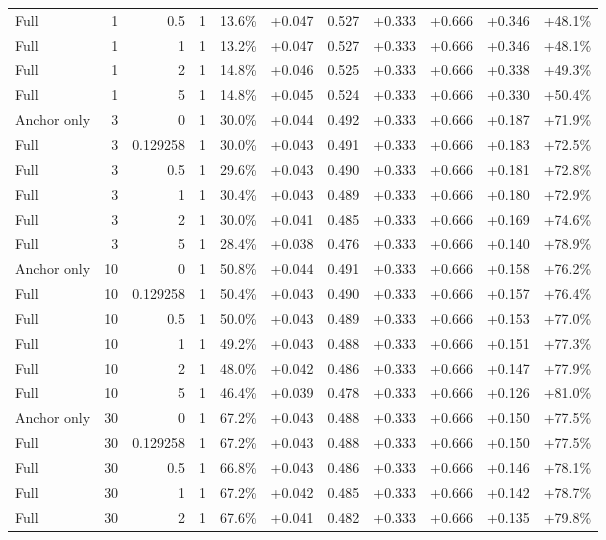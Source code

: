 \begin{table}[htbp]
\begin{tabular}{lrrrccccccc}
Full & 1 & 0.5 & 1 & 13.6\% & +0.047 & 0.527 & +0.333 & +0.666 & +0.346 & +48.1\% \\
Full & 1 & 1 & 1 & 13.2\% & +0.047 & 0.527 & +0.333 & +0.666 & +0.346 & +48.1\% \\
Full & 1 & 2 & 1 & 14.8\% & +0.046 & 0.525 & +0.333 & +0.666 & +0.338 & +49.3\% \\
Full & 1 & 5 & 1 & 14.8\% & +0.045 & 0.524 & +0.333 & +0.666 & +0.330 & +50.4\% \\
Anchor only & 3 & 0 & 1 & 30.0\% & +0.044 & 0.492 & +0.333 & +0.666 & +0.187 & +71.9\% \\
Full & 3 & 0.129258 & 1 & 30.0\% & +0.043 & 0.491 & +0.333 & +0.666 & +0.183 & +72.5\% \\
Full & 3 & 0.5 & 1 & 29.6\% & +0.043 & 0.490 & +0.333 & +0.666 & +0.181 & +72.8\% \\
Full & 3 & 1 & 1 & 30.4\% & +0.043 & 0.489 & +0.333 & +0.666 & +0.180 & +72.9\% \\
Full & 3 & 2 & 1 & 30.0\% & +0.041 & 0.485 & +0.333 & +0.666 & +0.169 & +74.6\% \\
Full & 3 & 5 & 1 & 28.4\% & +0.038 & 0.476 & +0.333 & +0.666 & +0.140 & +78.9\% \\
Anchor only & 10 & 0 & 1 & 50.8\% & +0.044 & 0.491 & +0.333 & +0.666 & +0.158 & +76.2\% \\
Full & 10 & 0.129258 & 1 & 50.4\% & +0.043 & 0.490 & +0.333 & +0.666 & +0.157 & +76.4\% \\
Full & 10 & 0.5 & 1 & 50.0\% & +0.043 & 0.489 & +0.333 & +0.666 & +0.153 & +77.0\% \\
Full & 10 & 1 & 1 & 49.2\% & +0.043 & 0.488 & +0.333 & +0.666 & +0.151 & +77.3\% \\
Full & 10 & 2 & 1 & 48.0\% & +0.042 & 0.486 & +0.333 & +0.666 & +0.147 & +77.9\% \\
Full & 10 & 5 & 1 & 46.4\% & +0.039 & 0.478 & +0.333 & +0.666 & +0.126 & +81.0\% \\
Anchor only & 30 & 0 & 1 & 67.2\% & +0.043 & 0.488 & +0.333 & +0.666 & +0.150 & +77.5\% \\
Full & 30 & 0.129258 & 1 & 67.2\% & +0.043 & 0.488 & +0.333 & +0.666 & +0.150 & +77.5\% \\
Full & 30 & 0.5 & 1 & 66.8\% & +0.043 & 0.486 & +0.333 & +0.666 & +0.146 & +78.1\% \\
Full & 30 & 1 & 1 & 67.2\% & +0.042 & 0.485 & +0.333 & +0.666 & +0.142 & +78.7\% \\
Full & 30 & 2 & 1 & 67.6\% & +0.041 & 0.482 & +0.333 & +0.666 & +0.135 & +79.8\% \\

\end{tabular}
\end{table}
